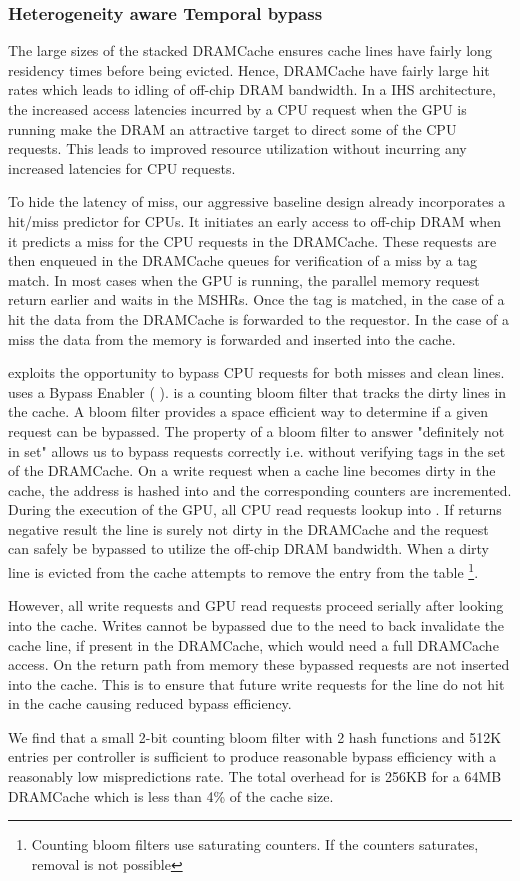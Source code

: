 \subsubsection{Heterogeneity aware Temporal bypass}
The large sizes of the stacked DRAMCache ensures cache lines have fairly long residency times before being evicted. Hence, DRAMCache have fairly large hit rates which leads to idling of off-chip DRAM bandwidth.
In a IHS architecture, the increased access latencies incurred by a CPU request when the GPU is running make the DRAM an attractive target to direct some of the CPU requests. This leads to improved resource utilization without incurring any increased latencies for CPU requests. 
\par To hide the latency of miss, our aggressive baseline design already incorporates a hit/miss predictor for CPUs. It initiates an early access to off-chip DRAM when it predicts a miss for the CPU requests in the DRAMCache. These requests are then enqueued in the DRAMCache queues for verification of a miss by a tag match. 
In most cases when the GPU is running, the parallel memory request return earlier and waits in the MSHRs. Once the tag is matched, in the case of a hit the data from the DRAMCache is forwarded to the requestor. In the case of a miss the data from the memory is forwarded and inserted into the cache. 
\par \cachename exploits the opportunity to bypass CPU requests for both misses and clean lines. \cachename uses a Bypass Enabler ( \bypassname). \bypassname is a counting bloom filter that tracks the dirty lines in the cache. A bloom filter provides a space efficient way to determine if a given request can be bypassed. The property of a bloom filter to answer "definitely not in set" allows us to bypass requests correctly i.e. without verifying tags in the set of the DRAMCache. 
On a write request when a cache line becomes dirty in the cache, the address is hashed into \bypassname and the corresponding counters are incremented. 
During the execution of the GPU, all CPU read requests lookup into \bypassname. If \bypassname returns negative result the line is surely not dirty in the DRAMCache and the request can safely be bypassed to utilize the off-chip DRAM bandwidth. 
When a dirty line is evicted from the cache \bypassname attempts to remove the entry from the table \footnote{Counting bloom filters use saturating counters. If the counters saturates, removal is not possible}.
\par However, all write requests and GPU read requests proceed serially after looking into the cache. Writes cannot be bypassed due to the need to back invalidate the cache line, if present in the DRAMCache, which would need a full DRAMCache access.
On the return path from memory these bypassed requests are not inserted into the cache. This is to ensure that future write requests for the line do not hit in the cache causing reduced bypass efficiency.
\par We find that a small 2-bit counting bloom filter with 2 hash functions and 512K entries per controller is sufficient to produce reasonable bypass efficiency with a reasonably low mispredictions rate. The total overhead for \bypassname is 256KB for a 64MB DRAMCache which is less than 4\% of the cache size.

